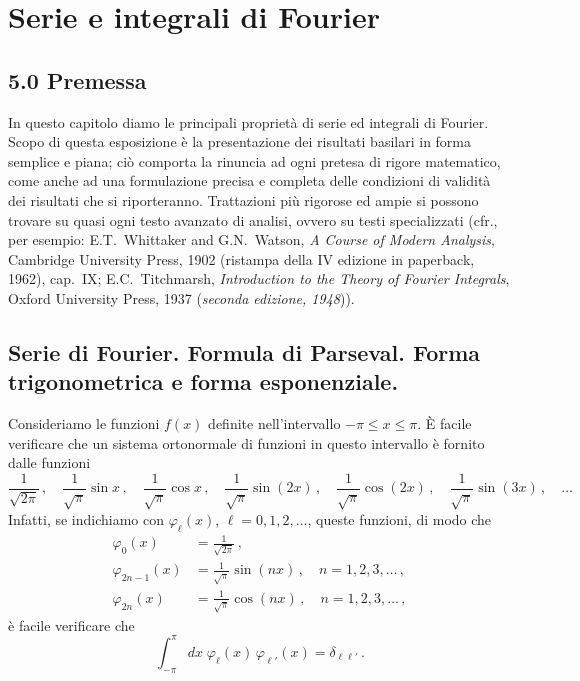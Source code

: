 \documentclass[11pt, a4paper]{book}
\numberwithin{equation}{section}
\begin{document}
\chapter{Serie e integrali di Fourier}

\section*{5.0 \quad Premessa}

In questo capitolo diamo le principali proprietà di serie ed integrali di Fourier. Scopo di questa esposizione è la presentazione dei risultati basilari in forma semplice e piana; ciò comporta la rinuncia ad ogni pretesa di rigore matematico, come anche ad una formulazione precisa e completa delle condizioni di validità dei risultati che si riporteranno. Trattazioni più rigorose ed ampie si possono trovare su quasi ogni testo avanzato di analisi, ovvero su testi specializzati (cfr., per esempio: E.T.\ Whittaker and G.N.\ Watson, \textit{A Course of Modern Analysis}, Cambridge University Press, 1902 (ristampa della IV edizione in paperback, 1962), cap.\ IX; E.C.\ Titchmarsh, \textit{Introduction to the Theory of Fourier Integrals}, Oxford University Press, 1937 (\textit{seconda edizione, 1948})).

\section{Serie di Fourier. Formula di Parseval. Forma trigonometrica e forma esponenziale.}

Consideriamo le funzioni $f(x)$ definite nell'intervallo $-\pi \leq x \leq \pi$. È facile verificare che un sistema ortonormale di funzioni in questo intervallo è fornito dalle funzioni
\[
  \frac{1}{\sqrt{2\pi}}\,,\quad
  \frac{1}{\sqrt{\pi}}\sin x\,,\quad
  \frac{1}{\sqrt{\pi}}\cos x\,,\quad
  \frac{1}{\sqrt{\pi}}\sin(2x)\,,\quad
  \frac{1}{\sqrt{\pi}}\cos(2x)\,,\quad
  \frac{1}{\sqrt{\pi}}\sin(3x)\,,\quad\ldots
\]
Infatti, se indichiamo con $\varphi_\ell(x)$, $\ell=0,1,2,\ldots$, queste funzioni, di modo che
\begin{align}
  \varphi_0(x) &= \frac{1}{\sqrt{2\pi}}\,, \tag{1a}\\
  \varphi_{2n-1}(x) &= \frac{1}{\sqrt{\pi}}\sin(nx)\,,\quad n=1,2,3,\ldots\,, \tag{1b}\\
  \varphi_{2n}(x) &= \frac{1}{\sqrt{\pi}}\cos(nx)\,,\quad n=1,2,3,\ldots\,, \tag{1c}
\end{align}
è facile verificare che
\begin{equation}
  \int_{-\pi}^{\pi} dx\;\varphi_\ell(x)\,\varphi_{\ell'}(x) = \delta_{\ell\ell'}\,. \tag{2}
\end{equation}
\end{document}
